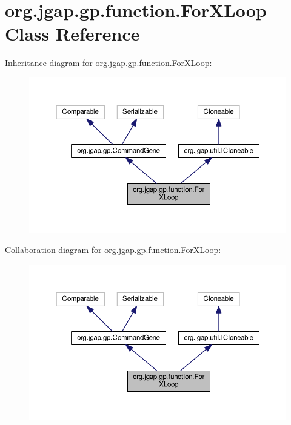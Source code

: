 \hypertarget{classorg_1_1jgap_1_1gp_1_1function_1_1_for_x_loop}{\section{org.\-jgap.\-gp.\-function.\-For\-X\-Loop Class Reference}
\label{classorg_1_1jgap_1_1gp_1_1function_1_1_for_x_loop}
}


Inheritance diagram for org.\-jgap.\-gp.\-function.\-For\-X\-Loop\-:
\nopagebreak
\begin{figure}[H]
\begin{center}
\leavevmode
\includegraphics[width=350pt]{classorg_1_1jgap_1_1gp_1_1function_1_1_for_x_loop__inherit__graph}
\end{center}
\end{figure}


Collaboration diagram for org.\-jgap.\-gp.\-function.\-For\-X\-Loop\-:
\nopagebreak
\begin{figure}[H]
\begin{center}
\leavevmode
\includegraphics[width=350pt]{classorg_1_1jgap_1_1gp_1_1function_1_1_for_x_loop__coll__graph}
\end{center}
\end{figure}
